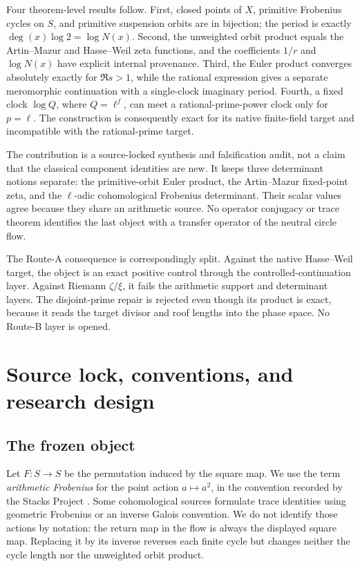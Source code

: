\documentclass[11pt]{article}
\theoremstyle{definition}
\theoremstyle{remark}
\begin{document}
Four theorem-level results follow.  First, closed points of \(X\), primitive
Frobenius cycles on \(S\), and primitive suspension orbits are in bijection;
the period is exactly \(\deg(x)\log2=\log N(x)\).  Second, the unweighted
orbit product equals the Artin--Mazur and Hasse--Weil zeta functions, and the
coefficients \(1/r\) and \(\log N(x)\) have explicit internal provenance.
Third, the Euler product converges absolutely exactly for \(\Re s>1\), while
the rational expression gives a separate meromorphic continuation with a
single-clock imaginary period.  Fourth, a fixed clock \(\log Q\), where
\(Q=\ell^f\), can meet a rational-prime-power clock only for \(p=\ell\).
The construction is consequently exact for its native finite-field target and
incompatible with the rational-prime target.

The contribution is a source-locked synthesis and falsification audit, not a
claim that the classical component identities are new.  It keeps three
determinant notions separate: the primitive-orbit Euler product, the
Artin--Mazur fixed-point zeta, and the \(\ell\)-adic cohomological Frobenius
determinant.  Their scalar values agree because they share an arithmetic
source.  No operator conjugacy or trace theorem identifies the last object
with a transfer operator of the neutral circle flow.

The Route-A consequence is correspondingly split.  Against the native
Hasse--Weil target, the object is an exact positive control through the
controlled-continuation layer.  Against Riemann \(\zeta/\xi\), it fails the
arithmetic support and determinant layers.  The disjoint-prime repair is
rejected even though its product is exact, because it reads the target divisor
and roof lengths into the phase space.  No Route-B layer is opened.

\section{Source lock, conventions, and research design}
\label{sec:lock}

\subsection{The frozen object}

Let \(F:S\to S\) be the permutation induced by the square map.  We use the
term \emph{arithmetic Frobenius} for the point action \(a\mapsto a^2\), in
the convention recorded by the Stacks Project \citep{Stacks03SL}.  Some
cohomological sources formulate trace identities using geometric Frobenius or
an inverse Galois convention.  We do not identify those actions by notation:
the return map in the flow is always the displayed square map.  Replacing it
by its inverse reverses each finite cycle but changes neither the cycle length
nor the unweighted orbit product.
\end{document}
